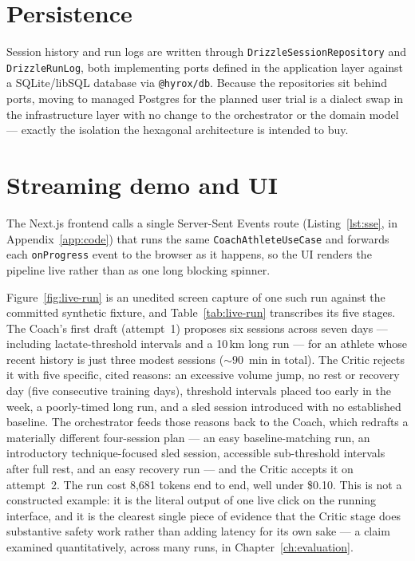 \section{Persistence}

Session history and run logs are written through \texttt{DrizzleSessionRepository} and \texttt{DrizzleRunLog}, both implementing ports defined in the application layer against a SQLite/libSQL database via \texttt{@hyrox/db}. Because the repositories sit behind ports, moving to managed Postgres for the planned user trial is a dialect swap in the infrastructure layer with no change to the orchestrator or the domain model --- exactly the isolation the hexagonal architecture is intended to buy.

\section{Streaming demo and UI}
\label{sec:streaming-ui}

The Next.js frontend calls a single Server-Sent Events route (Listing~\ref{lst:sse}, in Appendix~\ref{app:code}) that runs the same \texttt{CoachAthleteUseCase} and forwards each \texttt{onProgress} event to the browser as it happens, so the UI renders the pipeline live rather than as one long blocking spinner.

Figure~\ref{fig:live-run} is an unedited screen capture of one such run against the committed synthetic fixture, and Table~\ref{tab:live-run} transcribes its five stages. The Coach's first draft (attempt~1) proposes six sessions across seven days --- including lactate-threshold intervals and a 10\,km long run --- for an athlete whose recent history is just three modest sessions (${\sim}90$~min in total). The Critic rejects it with five specific, cited reasons: an excessive volume jump, no rest or recovery day (five consecutive training days), threshold intervals placed too early in the week, a poorly-timed long run, and a sled session introduced with no established baseline. The orchestrator feeds those reasons back to the Coach, which redrafts a materially different four-session plan --- an easy baseline-matching run, an introductory technique-focused sled session, accessible sub-threshold intervals after full rest, and an easy recovery run --- and the Critic accepts it on attempt~2. The run cost 8{,}681 tokens end to end, well under \$0.10. This is not a constructed example: it is the literal output of one live click on the running interface, and it is the clearest single piece of evidence that the Critic stage does substantive safety work rather than adding latency for its own sake --- a claim examined quantitatively, across many runs, in Chapter~\ref{ch:evaluation}.

